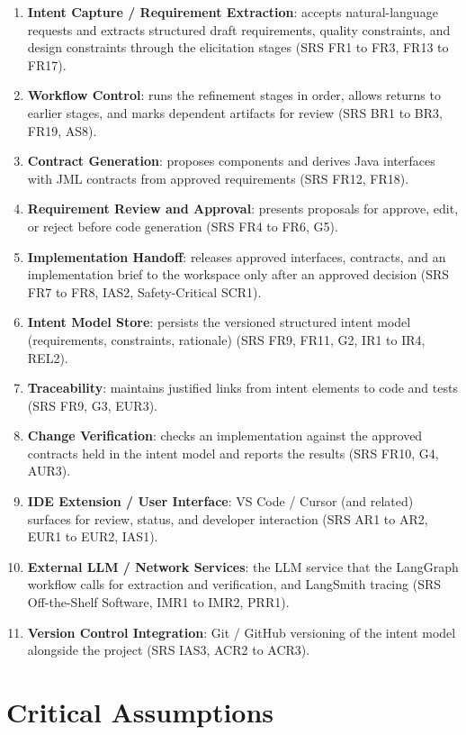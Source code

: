 \documentclass{article}
\begin{document}
\begin{enumerate}
  \item \textbf{Intent Capture / Requirement Extraction}: accepts
  natural-language requests and extracts structured draft requirements,
  quality constraints, and design constraints through the elicitation stages
  (SRS FR1 to FR3, FR13 to FR17).
  \item \textbf{Workflow Control}: runs the refinement stages in order, allows
  returns to earlier stages, and marks dependent artifacts for review (SRS BR1
  to BR3, FR19, AS8).
  \item \textbf{Contract Generation}: proposes components and derives Java
  interfaces with JML contracts from approved requirements (SRS FR12, FR18).
  \item \textbf{Requirement Review and Approval}: presents proposals for
  approve, edit, or reject before code generation (SRS FR4 to FR6, G5).
  \item \textbf{Implementation Handoff}: releases approved interfaces,
  contracts, and an implementation brief to the workspace only after an
  approved decision (SRS FR7 to FR8, IAS2, Safety-Critical SCR1).
  \item \textbf{Intent Model Store}: persists the versioned structured
  intent model (requirements, constraints, rationale) (SRS FR9, FR11, G2,
  IR1 to IR4, REL2).
  \item \textbf{Traceability}: maintains justified links from intent
  elements to code and tests (SRS FR9, G3, EUR3).
  \item \textbf{Change Verification}: checks an implementation against the
  approved contracts held in the intent model and reports the results (SRS
  FR10, G4, AUR3).
  \item \textbf{IDE Extension / User Interface}: VS Code / Cursor (and
  related) surfaces for review, status, and developer interaction
  (SRS AR1 to AR2, EUR1 to EUR2, IAS1).
  \item \textbf{External LLM / Network Services}: the LLM service that the
  LangGraph workflow calls for extraction and verification, and LangSmith
  tracing (SRS Off-the-Shelf Software, IMR1 to IMR2, PRR1).
  \item \textbf{Version Control Integration}: Git / GitHub versioning of the
  intent model alongside the project (SRS IAS3, ACR2 to ACR3).
\end{enumerate}

\section{Critical Assumptions}
\end{document}
